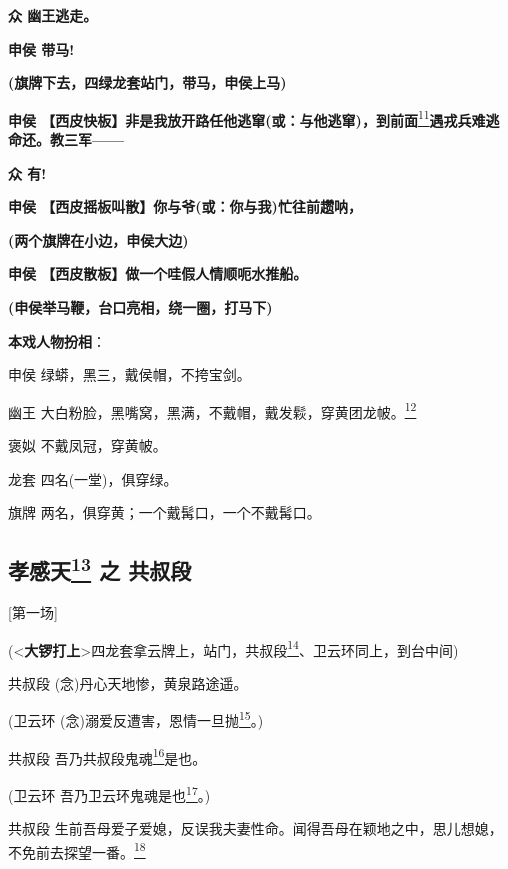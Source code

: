 \textbf{众 幽王逃走。}

\textbf{申侯 带马!}

\textbf{(旗牌下去，四绿龙套站门，带马，申侯上马)}

\textbf{申侯
【西皮快板】非是我放开路任他逃窜(或：与他逃窜)，到前面}\protect\hyperlink{fn11}{\textsuperscript{11}}\textbf{遇戎兵难逃命还。教三军------}

\textbf{众 有!}

\textbf{申侯 【西皮摇板叫散】你与爷(或：你与我)忙往前趱呐，}

\textbf{(两个旗牌在小边，申侯大边)}

\textbf{申侯 【西皮散板】做一个哇假人情顺呃水推船。}

\textbf{(申侯举马鞭，台口亮相，绕一圈，打马下)}

\textbf{本戏人物扮相}：

申侯 绿蟒，黑三，戴侯帽，不挎宝剑。

幽王
大白粉脸，黑嘴窝，黑满，不戴帽，戴发鬏，穿黄团龙帔。\protect\hyperlink{fn12}{\textsuperscript{12}}

褒姒 不戴凤冠，穿黄帔。

龙套 四名(一堂)，俱穿绿。

旗牌 两名，俱穿黄；一个戴髯口，一个不戴髯口。

\newpage
\hypertarget{ux5b5dux611fux5929-ux4e4b-ux5171ux53d4ux6bb5}{%
\subsection{\texorpdfstring{孝感天\protect\hyperlink{fn13}{\textsuperscript{13}}
之
共叔段}{孝感天13 之 共叔段}}\label{ux5b5dux611fux5929-ux4e4b-ux5171ux53d4ux6bb5}}

{[}第一场{]}

(\textless{}\textbf{大锣打上}\textgreater{}四龙套拿云牌上，站门，共叔段\protect\hyperlink{fn14}{\textsuperscript{14}}、卫云环同上，到台中间)

共叔段 (念)丹心天地惨，黄泉路途遥。

(卫云环
(念)溺爱反遭害，恩情一旦抛\protect\hyperlink{fn15}{\textsuperscript{15}}。)

共叔段
吾乃共叔段鬼魂\protect\hyperlink{fn16}{\textsuperscript{16}}是也。

(卫云环
吾乃卫云环鬼魂是也\protect\hyperlink{fn17}{\textsuperscript{17}}。)

共叔段
生前吾母爱子爱媳，反误我夫妻性命。闻得吾母在颖地之中，思儿想媳，不免前去探望一番。\protect\hyperlink{fn18}{\textsuperscript{18}}

